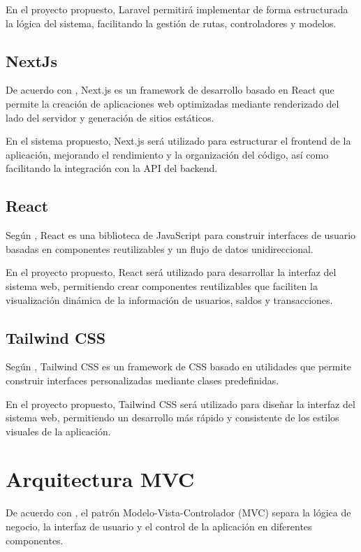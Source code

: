 \documentclass[12pt,letterpaper]{report}
\begin{document}
	En el proyecto propuesto, Laravel permitirá implementar de forma estructurada la lógica del sistema, facilitando la gestión de rutas, controladores y modelos.
	
	\subsection{NextJs}
	
	De acuerdo con \citet{nextjs2023}, Next.js es un framework de desarrollo basado en React que permite la creación de aplicaciones web optimizadas mediante renderizado del lado del servidor y generación de sitios estáticos.
	
	En el sistema propuesto, Next.js será utilizado para estructurar el frontend de la aplicación, mejorando el rendimiento y la organización del código, así como facilitando la integración con la API del backend.
	
	\subsection{React}
	
	Según \citet{react2023}, React es una biblioteca de JavaScript para construir interfaces de usuario basadas en componentes reutilizables y un flujo de datos unidireccional.
	
	En el proyecto propuesto, React será utilizado para desarrollar la interfaz del sistema web, permitiendo crear componentes reutilizables que faciliten la visualización dinámica de la información de usuarios, saldos y transacciones.
	\subsection{Tailwind CSS}
	
	Según \citet{tailwind2023}, Tailwind CSS es un framework de CSS basado en utilidades que permite construir interfaces personalizadas mediante clases predefinidas.
	
	En el proyecto propuesto, Tailwind CSS será utilizado para diseñar la interfaz del sistema web, permitiendo un desarrollo más rápido y consistente de los estilos visuales de la aplicación.
	
	
	\section{Arquitectura MVC}
	
	De acuerdo con \citet{gamma1994}, el patrón Modelo-Vista-Controlador (MVC) separa la lógica de negocio, la interfaz de usuario y el control de la aplicación en diferentes componentes.
	
\end{document}
